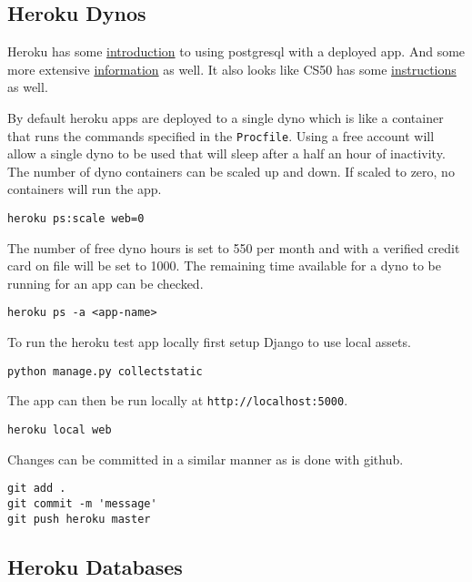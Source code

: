 \documentclass[]{book}
\begin{document}
\subsection{Heroku Dynos}\label{heroku-dynos}

Heroku has some
\href{'https://devcenter.heroku.com/articles/getting-started-with-python\#provision-a-database'}{introduction}
to using postgresql with a deployed app. And some more extensive
\href{'https://devcenter.heroku.com/articles/heroku-postgresql'}{information}
as well. It also looks like CS50 has some
\href{'https://cs50.readthedocs.io/heroku/'}{instructions} as well.

By default heroku apps are deployed to a single dyno which is like a
container that runs the commands specified in the \texttt{Procfile}.
Using a free account will allow a single dyno to be used that will sleep
after a half an hour of inactivity. The number of dyno containers can be
scaled up and down. If scaled to zero, no containers will run the app.

\begin{verbatim}
heroku ps:scale web=0
\end{verbatim}

The number of free dyno hours is set to 550 per month and with a
verified credit card on file will be set to 1000. The remaining time
available for a dyno to be running for an app can be checked.

\begin{verbatim}
heroku ps -a <app-name>
\end{verbatim}

To run the heroku test app locally first setup Django to use local
assets.

\begin{verbatim}
python manage.py collectstatic
\end{verbatim}

The app can then be run locally at \texttt{http://localhost:5000}.

\begin{verbatim}
heroku local web
\end{verbatim}

Changes can be committed in a similar manner as is done with github.

\begin{verbatim}
git add .
git commit -m 'message'
git push heroku master
\end{verbatim}

\subsection{Heroku Databases}\label{heroku-databases}
\end{document}
